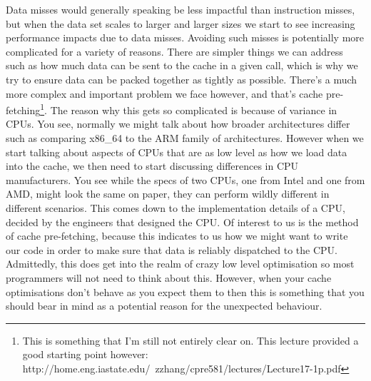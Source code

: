 \documentclass{article}
\begin{document}
Data misses would generally speaking be less impactful than instruction misses,
but when the data set scales to larger and larger sizes we start to see
increasing performance impacts due to data misses. Avoiding such misses is
potentially more complicated for a variety of reasons. There are simpler things
we can address such as how much data can be sent to the cache in a given call,
which is why we try to ensure data can be packed together as tightly as
possible. There's a much more complex and important problem we face however,
and that's cache
pre-fetching\footnote{This is something that I'm still not entirely clear on. This lecture provided a good starting point however: http://home.eng.iastate.edu/~zzhang/cpre581/lectures/Lecture17-1p.pdf}.
The reason why this gets so complicated is because of variance in CPUs. You see,
normally we might talk about how broader architectures differ such as comparing
x86\_64 to the ARM family of architectures. However when we start talking about
aspects of CPUs that are as low level as how we load data into the cache, we
then need to start discussing differences in CPU manufacturers. You see while
the specs of two CPUs, one from Intel and one from AMD, might look the same on
paper, they can perform wildly different in different scenarios. This comes down
to the implementation details of a CPU, decided by the engineers that designed
the CPU. Of interest to us is the method of cache pre-fetching, because this
indicates to us how we might want to write our code in order to make sure that
data is reliably dispatched to the CPU. Admittedly, this does get into the realm
of crazy low level optimisation so most programmers will not need to think about
this. However, when your cache optimisations don't behave as you expect them to
then this is something that you should bear in mind as a potential reason for
the unexpected behaviour.
\end{document}
